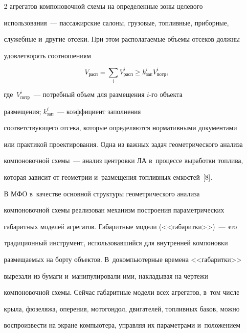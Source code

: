 \begin{multicols}{2}
агрегатов компоновочной схемы на определенные зоны целевого 


использования~--- пассажирские салоны, грузовые, топ\-лив\-ные, приборные, 


служебные и~другие отсеки. При этом располагаемые объемы отсеков должны 


удовлетворять соотношениям  


$$


V_{\mathrm{расп}}= \sum\limits_i 


V^i_{\mathrm{расп}} \geq k^i_{\mathrm{зап}} V^i_{\mathrm{потр}},


$$


 где~$V^i_{\mathrm{потр}}$~--- по\-треб\-ный объем для размещения $i$-го объекта 


размещения; $ k^i_{\mathrm{зап}}$~--- коэффициент заполнения 


со\-от\-вет\-ст\-ву\-юще\-го отсека, которые определяются нормативными документами 


или практикой проектирования. Одна из важных задач гео\-мет\-ри\-че\-ско\-го анализа 


компоновочной схемы~--- анализ цент\-ров\-ки ЛА в~процессе выработки топ\-ли\-ва, 


которая зависит от гео\-мет\-рии и~размещения топ\-лив\-ных емкостей~[8]. 








  


  В МФО в~качестве основной структуры геометрического анализа 


компоновочной схемы реализован механизм построения па\-ра\-мет\-ри\-че\-ских 


габаритных моделей агрегатов. Габаритные модели (<<габаритки>>)~--- это 


традиционный инструмент, ис\-поль\-зо\-вав\-ший\-ся для внут\-рен\-ней компоновки 


размещаемых на борту объектов. В~докомпьютерные времена <<габаритки>> 


вырезали из бумаги и~манипулировали ими, накладывая на чертежи 


компоновочной схемы. Сейчас габаритные модели всех агрегатов, в~том числе 


крыла, фюзеляжа, оперения, мотогондол, двигателей, топливных баков, можно 


воспроизвести на экране компьютера, управляя их параметрами и~положением 



\end{multicols}
